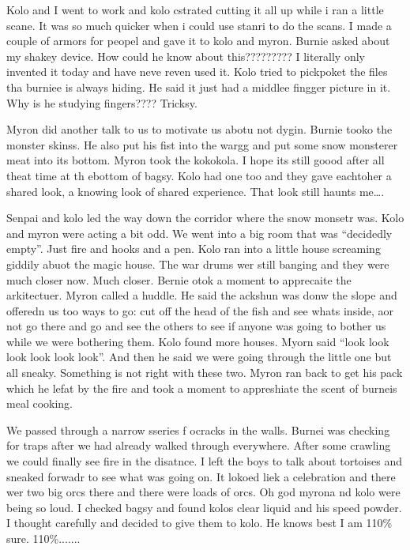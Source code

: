 Kolo and I went to work and kolo cstrated cutting it all up while i ran a little scane. It was so much quicker when i could use stanri to do the scans. I made a couple of armors for peopel and gave it to kolo and myron. Burnie asked about my shakey device. How could he know about this????????? I literally only invented it today and have neve reven used it. Kolo tried to pickpoket the files tha burniee is always hiding. He said it just had a middlee fingger picture in it. Why is he studying fingers???? Tricksy.\medskip

Myron did another talk to us to motivate us abotu not dygin. Burnie tooko the monster skinss. He also put his fist into the wargg and put some snow monsterer meat into its bottom. Myron took the kokokola. I hope its still goood after all theat time at th ebottom of bagsy. Kolo had one too and they gave eachtoher a shared look, a knowing look of shared experience. That look still haunts me….\medskip

Senpai and kolo led the way down the corridor where the snow monsetr was. Kolo and myron were acting a bit odd. We went into a big room that was “decidedly empty”. Just fire and hooks and a pen. Kolo ran into a little house screaming giddily abuot the magic house. The war drums wer still banging and they were much closer now. Much closer. Bernie otok a moment to apprecaite the arkitectuer. Myron called a huddle. He said the ackshun was donw the slope and offeredn us too ways to go: cut off the head of the fish and see whats inside, aor not go there and go and see the others to see if anyone was going to bother us while we were bothering them. Kolo found more houses. Myorn said “look look look look look look”. And then he said we were going through the little one but all sneaky. Something is not right with these two. Myron ran back to get his pack which he lefat by the fire and took a moment to appreshiate the scent of burneis meal cooking.\medskip

We passed through a narrow sseries f ocracks in the walls. Burnei was checking for traps after we had already walked through everywhere. After some crawling we could finally see fire in the disatnce. I left the boys to talk about tortoises and sneaked forwadr to see what was going on. It lokoed liek a celebration and there wer two big orcs there and there were loads of orcs. Oh god myrona nd kolo were being so loud. I checked bagsy and found kolos clear liquid and his speed powder. I thought carefully and decided to give them to kolo. He knows best I am 110\% sure. 110\%.......\medskip

